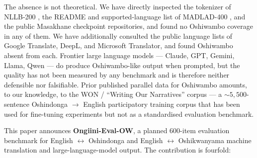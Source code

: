 \documentclass[11pt]{article}
\begin{document}
The absence is not theoretical. We have directly inspected the
tokenizer of NLLB-200 \citep{costajussa2022nllb}, the README and
supported-language list of MADLAD-400 \citep{kudugunta2023madlad},
and the public Masakhane checkpoint repositories, and found no
Oshiwambo coverage in any of them. We have additionally consulted
the public language lists of Google Translate, DeepL, and Microsoft
Translator, and found Oshiwambo absent from each. Frontier large
language models --- Claude, GPT, Gemini, Llama, Qwen --- do
produce Oshiwambo-like output when prompted, but the quality has
not been measured by any benchmark and is therefore neither
defensible nor falsifiable. Prior published parallel data for
Oshiwambo amounts, to our knowledge, to the WON / ``Writing Our
Narratives'' corpus \citep{nekoto2022won} --- a $\sim 5{,}500$-sentence
Oshindonga $\rightarrow$ English participatory training corpus that
has been used for fine-tuning experiments but not as a
standardised evaluation benchmark.

This paper announces \textbf{Ongiini-Eval-OW}, a planned 600-item
evaluation benchmark for English $\leftrightarrow$ Oshindonga and
English $\leftrightarrow$ Oshikwanyama machine translation and
large-language-model output. The contribution is fourfold:
\end{document}
